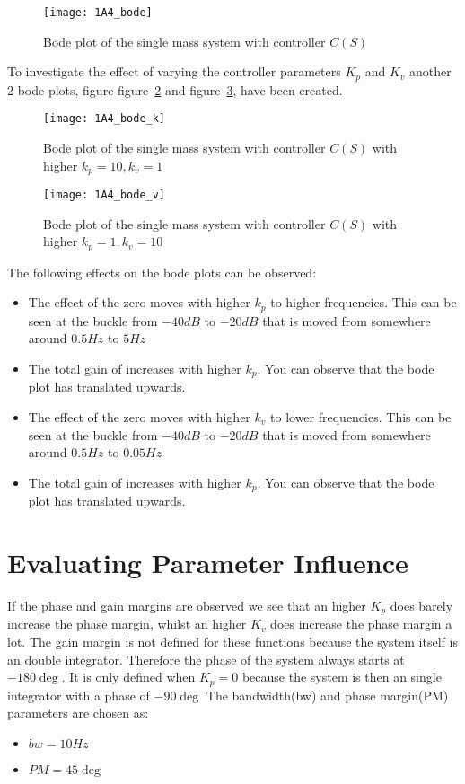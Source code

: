 \documentclass[report.tex]{subfiles}
\begin{document}
\begin{figure}
  \centering
    \texttt{[image: 1A4\_bode]}
 	\caption{Bode plot of the single mass system with controller $C(S)$}
  \label{fig:1A4_bode}
\end{figure}
\newpage
To investigate the effect of varying the controller parameters $K_p$ and $K_v$ another 2 bode plots, figure figure~\ref{fig:1A4_bode_k} and figure~\ref{fig:1A4_bode_v}, have been created. 
\begin{figure}
  \centering
\texttt{[image: 1A4\_bode\_k]}
\caption{Bode plot of the single mass system with controller $C(S)$ with higher $k_p = 10, k_v
 = 1$}
\label{fig:1A4_bode_k}
\end{figure}

\begin{figure}
  \centering
\texttt{[image: 1A4\_bode\_v]}
\caption{Bode plot of the single mass system with controller $C(S)$ with higher $k_p = 1, k_v = 10$}
\label{fig:1A4_bode_v}
\end{figure}

The following effects on the bode plots can be observed:
\begin{itemize}
\item{The effect of the zero moves with higher $k_p$ to higher frequencies. This can be seen at the buckle from $-40 dB$ to $-20 dB$ that is moved from somewhere around $0.5 Hz$ to $5 Hz$}
\item{The total gain of increases with higher $k_p$. You can observe that the bode plot has translated upwards.}
\item{The effect of the zero moves with higher $k_v$ to lower frequencies. This can be seen at the buckle from $-40 dB$ to $-20 dB$ that is moved from somewhere around $0.5 Hz$ to $0.05 Hz$}
\item{The total gain of increases with higher $k_p$. You can observe that the bode plot has translated upwards.}
\end{itemize}

\section{Evaluating Parameter Influence}
If the phase and gain margins are observed we see that an higher $K_p$ does barely increase the phase margin, whilst an higher $K_v$ does increase the phase margin a lot. The gain margin is not defined for these functions because the system itself is an double integrator. Therefore the phase of the system always starts at $-180\deg$. It is only defined when $K_p = 0$ because the system is then an single integrator with a phase of $-90\deg$	
\newpage
The bandwidth(bw) and phase margin(PM) parameters are chosen as: 
\begin{itemize}
\item{$bw = 10 Hz$}
\item{$PM = 45\deg$}
\end{itemize}
\end{document}
